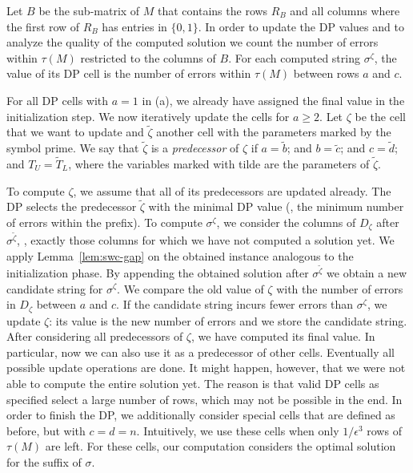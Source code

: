 Let $B$ be the sub-matrix of $M$ that contains the rows $R_B$ and all columns where the first row of $R_B$ has entries in $\{0,1\}$. 
In order to update the DP values and to analyze the quality of the computed solution we count the number of errors within $\tau(M)$ restricted to the columns of $B$.
For each computed string $\sigma^\zeta$, the value of its DP cell is the number of errors within $\tau(M)$ between rows $a$ and $c$.

For all DP cells with $a=1$ in (a), we already have assigned the final value in the initialization step.
We now iteratively update the cells for $a \ge 2$.
Let $\zeta$ be the cell that we want to update
and $\tilde{\zeta}$ another cell with the parameters marked by the symbol prime.
We say that $\tilde{\zeta}$ is a \emph{predecessor} of $\zeta$ if $a = \tilde{b}$; and $b = \tilde{c}$; and $c = \tilde{d}$; and $T_U = \tilde{T}_L$, where the variables marked with tilde are the parameters of $\tilde{\zeta}$.

To compute $\zeta$, we assume that all of its predecessors are updated already.
The DP selects the predecessor $\tilde{\zeta}$ with the minimal DP value (\ie, the minimum number of errors within the prefix).
To compute $\sigma^\zeta$, we consider the columns of $D_\zeta$ after ${\sigma}^{\tilde{\zeta}}$, \ie, exactly those columns for which we have not computed a solution yet.
We apply Lemma~\ref{lem:swc-gap} on the obtained instance analogous to the initialization phase.
By appending the obtained solution after $\sigma^{\tilde{\zeta}}$ we obtain a new candidate string for $\sigma^\zeta$.
We compare the old value of $\zeta$ with the number of errors in $D_\zeta$ between $a$ and $c$.
If the candidate string incurs fewer errors than $\sigma^\zeta$, we update $\zeta$: its value is the new number of errors and we store the candidate string.
After considering all predecessors of $\zeta$, we have computed its final value.
In particular, now we can also use it as a predecessor of other cells.
Eventually all possible update operations are done.
It might happen, however, that we were not able to compute the entire solution yet.
The reason is that valid DP cells as specified select a large number of rows, which may not be possible in the end.
In order to finish the DP, we additionally consider special cells that are defined as before, but with $c=d=n$. 
Intuitively, we use these cells when only $1/\epsilon^3$ rows of $\tau(M)$ are left.
For these cells, our computation considers the optimal solution for the suffix of $\sigma$.

